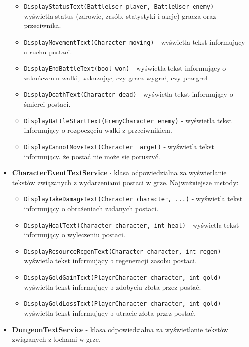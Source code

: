 \begin{itemize}
\begin{itemize}
                    \item \texttt{DisplayStatusText(BattleUser player, BattleUser enemy)} - wyświetla status (zdrowie, zasób, statystyki i akcje) gracza oraz przeciwnika.
                    \item \texttt{DisplayMovementText(Character moving)} - wyświetla tekst informujący o ruchu postaci.
                    \item \texttt{DisplayEndBattleText(bool won)} - wyświetla tekst informujący o zakończeniu walki, wskazując, czy gracz wygrał, czy przegrał.
                    \item \texttt{DisplayDeathText(Character dead)} - wyświetla tekst informujący o śmierci postaci.
                    \item \texttt{DisplayBattleStartText(EnemyCharacter enemy)} - wyświetla tekst informujący o rozpoczęciu walki z przeciwnikiem.
                    \item \texttt{DisplayCannotMoveText(Character target)} - wyświetla tekst informujący, że postać nie może się poruszyć.
                \end{itemize}
            \item \textbf{CharacterEventTextService} - klasa odpowiedzialna za wyświetlanie tekstów związanych z wydarzeniami postaci w grze. 
            Najważniejsze metody:
                \begin{itemize}
                    \item \texttt{DisplayTakeDamageText(Character character, ...)} - wyświetla tekst informujący o obrażeniach zadanych postaci.
                    \item \texttt{DisplayHealText(Character character, int heal)} - wyświetla tekst informujący o wyleczeniu postaci.
                    \item \texttt{DisplayResourceRegenText(Character character, int regen)} - wyświetla tekst informujący o regeneracji zasobu postaci.
                    \item \texttt{DisplayGoldGainText(PlayerCharacter character, int gold)} - wyświetla tekst informujący o zdobyciu złota przez postać.
                    \item \texttt{DisplayGoldLossText(PlayerCharacter character, int gold)} - wyświetla tekst informujący o utracie złota przez postać.
                \end{itemize}
            \item \textbf{DungeonTextService} - klasa odpowiedzialna za wyświetlanie tekstów związanych z lochami w grze. 

\end{itemize}
